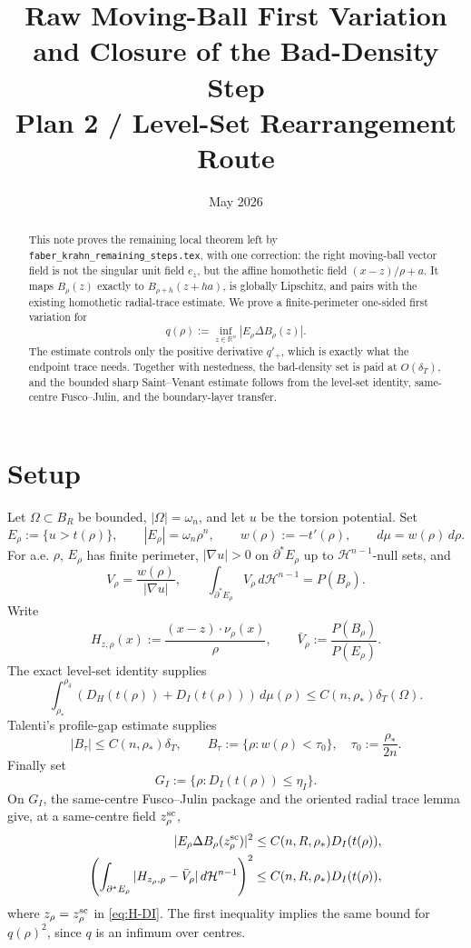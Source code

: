 \documentclass[11pt]{article}
\title{Raw Moving-Ball First Variation and Closure of the Bad-Density Step\\
       \large Plan 2 / Level-Set Rearrangement Route}
\author{}
\date{May 2026}
\theoremstyle{definition}
\newcommand{\R}{\mathbb R}
\newcommand{\HH}{\mathcal H}
\newcommand{\rstar}{\rho_*}
\newcommand{\rdel}{\rho_\delta}
\newcommand{\wt}{w}
\begin{document}
\maketitle

\begin{abstract}
This note proves the remaining local theorem left by
\texttt{faber\_krahn\_remaining\_steps.tex}, with one correction: the right
moving-ball vector field is not the singular unit field \(e_z\), but the
affine homothetic field \((x-z)/\rho+a\).  It maps \(B_\rho(z)\) exactly to
\(B_{\rho+h}(z+ha)\), is globally Lipschitz, and pairs with the existing
homothetic radial-trace estimate.  We prove a finite-perimeter one-sided
first variation for
\[
   q(\rho):=\inf_{z\in\R^n}|E_\rho\Delta B_\rho(z)|.
\]
The estimate controls only the positive derivative \(q'_+\), which is exactly
what the endpoint trace needs.  Together with nestedness, the bad-density
set is paid at \(O(\delta_T)\), and the bounded sharp Saint--Venant estimate
follows from the level-set identity, same-centre Fusco--Julin, and the
boundary-layer transfer.
\end{abstract}

\tableofcontents

\section{Setup}

Let \(\Omega\subset B_R\) be bounded, \(|\Omega|=\omega_n\), and let \(u\) be
the torsion potential.  Set
\[
   E_\rho:=\{u>t(\rho)\},\qquad |E_\rho|=\omega_n\rho^n,\qquad
   \wt(\rho):=-t'(\rho),\qquad d\mu=\wt(\rho)\,d\rho .
\]
For a.e. \(\rho\), \(E_\rho\) has finite perimeter, \(|\nabla u|>0\) on
\(\partial^*E_\rho\) up to \(\HH^{n-1}\)-null sets, and
\[
   V_\rho=\frac{\wt(\rho)}{|\nabla u|},\qquad
   \int_{\partial^*E_\rho}V_\rho\,d\HH^{n-1}=P(B_\rho).
\]
Write
\[
   H_{z,\rho}(x):=\frac{(x-z)\cdot\nu_\rho(x)}{\rho},\qquad
   \bar V_\rho:=\frac{P(B_\rho)}{P(E_\rho)}.
\]
The exact level-set identity supplies
\begin{equation}\label{eq:budget}
   \int_{\rstar}^{\rdel}(D_H(t(\rho))+D_I(t(\rho)))\,d\mu(\rho)
   \le C(n,\rstar)\delta_T(\Omega).
\end{equation}
Talenti's profile-gap estimate supplies
\begin{equation}\label{eq:badtau}
   |B_\tau|\le C(n,\rstar)\delta_T,\qquad
   B_\tau:=\{\rho:\wt(\rho)<\tau_0\},\quad
   \tau_0:=\frac{\rstar}{2n}.
\end{equation}
Finally set
\[
   G_I:=\{\rho:D_I(t(\rho))\le\eta_I\}.
\]
On \(G_I\), the same-centre Fusco--Julin package and the oriented radial
trace lemma give, at a same-centre field \(z_\rho^{\rm sc}\),
\begin{align}
   |E_\rho\Delta B_\rho(z_\rho^{\rm sc})|^2
   &\le C(n,R,\rstar)D_I(t(\rho)), \label{eq:q-DI}\\
   \left(\int_{\partial^*E_\rho}|H_{z_\rho,\rho}-\bar V_\rho|\,d\HH^{n-1}\right)^2
   &\le C(n,R,\rstar)D_I(t(\rho)), \label{eq:H-DI}
\end{align}
where \(z_\rho=z_\rho^{\rm sc}\) in \eqref{eq:H-DI}.  The first inequality
implies the same bound for \(q(\rho)^2\), since \(q\) is an infimum over
centres.
\end{document}
